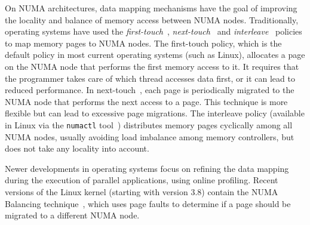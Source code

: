 On NUMA architectures, data mapping mechanisms have the goal of improving the locality and balance of memory access between NUMA nodes.
Traditionally, operating systems have used the \emph{first-touch}~\cite{Marchetti1995}, \emph{next-touch}~\cite{Lof2005} and \emph{interleave}~\cite{Kleen2004} policies to map memory pages to NUMA nodes.
The first-touch policy, which is the default policy in most current operating systems (such as Linux), allocates a page on the NUMA node that performs the first memory access to it.
It requires that the programmer takes care of which thread accesses data
first, or it can lead to reduced performance.
In next-touch~\cite{Lof2005}, each page is periodically migrated to the NUMA
node that performs the next access to a page. This technique is more flexible
but can lead to excessive page migrations.
The interleave policy (available in Linux via the \texttt{numactl}
tool~\cite{Kleen2004}) distributes memory pages cyclically among all NUMA nodes,
usually avoiding load imbalance among memory controllers, but does not take any locality into account.

Newer developments in operating systems focus on refining the data mapping during the execution of parallel applications, using online profiling.
Recent versions of the Linux kernel (starting with version 3.8) contain the
NUMA Balancing technique~\cite{Corbet}, which uses page faults to determine if
a page should be migrated to a different NUMA node.%


